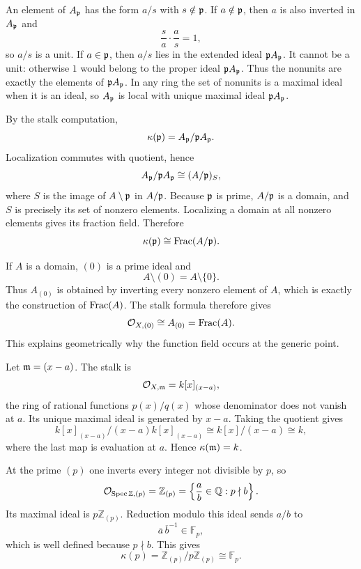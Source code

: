 \begin{solution}[Exercise VI.17.5]
An element of $A_{\mathfrak p}$ has the form $a/s$ with $s\notin\mathfrak p$.  If $a\notin\mathfrak p$, then $a$ is also inverted in $A_{\mathfrak p}$ and
\[
\frac{s}{a}\cdot\frac{a}{s}=1,
\]
so $a/s$ is a unit.
If $a\in\mathfrak p$, then $a/s$ lies in the extended ideal $\mathfrak p A_{\mathfrak p}$.  It cannot be a unit: otherwise $1$ would belong to the proper ideal $\mathfrak p A_{\mathfrak p}$.  Thus the nonunits are exactly the elements of $\mathfrak p A_{\mathfrak p}$.  In any ring the set of nonunits is a maximal ideal when it is an ideal, so $A_{\mathfrak p}$ is local with unique maximal ideal $\mathfrak p A_{\mathfrak p}$.
\end{solution}

\begin{solution}[Exercise VI.17.6]
By the stalk computation,
\[
\kappa(\mathfrak p)=A_{\mathfrak p}/\mathfrak p A_{\mathfrak p}.
\]
Localization commutes with quotient, hence
\[
A_{\mathfrak p}/\mathfrak p A_{\mathfrak p}\cong (A/\mathfrak p)_{S},
\]
where $S$ is the image of $A\setminus\mathfrak p$ in $A/\mathfrak p$.  Because $\mathfrak p$ is prime, $A/\mathfrak p$ is a domain, and $S$ is precisely its set of nonzero elements.  Localizing a domain at all nonzero elements gives its fraction field.  Therefore
\[
\kappa(\mathfrak p)\cong\operatorname{Frac}(A/\mathfrak p).
\]
\end{solution}

\begin{solution}[Exercise VI.17.7]
If $A$ is a domain, $(0)$ is a prime ideal and
\[
A\setminus(0)=A\setminus\{0\}.
\]
Thus $A_{(0)}$ is obtained by inverting every nonzero element of $A$, which is exactly the construction of $\operatorname{Frac}(A)$.  The stalk formula therefore gives
\[
\mathcal O_{X,(0)}\cong A_{(0)}=\operatorname{Frac}(A).
\]
This explains geometrically why the function field occurs at the generic point.
\end{solution}

\begin{solution}[Exercise VI.17.8]
Let $\mathfrak m=(x-a)$.  The stalk is
\[
\mathcal O_{X,\mathfrak m}=k[x]_{(x-a)},
\]
the ring of rational functions $p(x)/q(x)$ whose denominator does not vanish at $a$.  Its unique maximal ideal is generated by $x-a$.
Taking the quotient gives
\[
k[x]_{(x-a)}/(x-a)k[x]_{(x-a)}\cong k[x]/(x-a)\cong k,
\]
where the last map is evaluation at $a$.  Hence $\kappa(\mathfrak m)=k$.
\end{solution}

\begin{solution}[Exercise VI.17.9]
At the prime $(p)$ one inverts every integer not divisible by $p$, so
\[
\mathcal O_{\operatorname{Spec}\mathbb Z,(p)}=\mathbb Z_{(p)}
=\left\{\frac ab\in\mathbb Q:p\nmid b\right\}.
\]
Its maximal ideal is $p\mathbb Z_{(p)}$.  Reduction modulo this ideal sends $a/b$ to
\[
\overline a\,\overline b^{-1}\in\mathbb F_p,
\]
which is well defined because $p\nmid b$.  This gives
\[
\kappa(p)=\mathbb Z_{(p)}/p\mathbb Z_{(p)}\cong\mathbb F_p.
\]
\end{solution}

